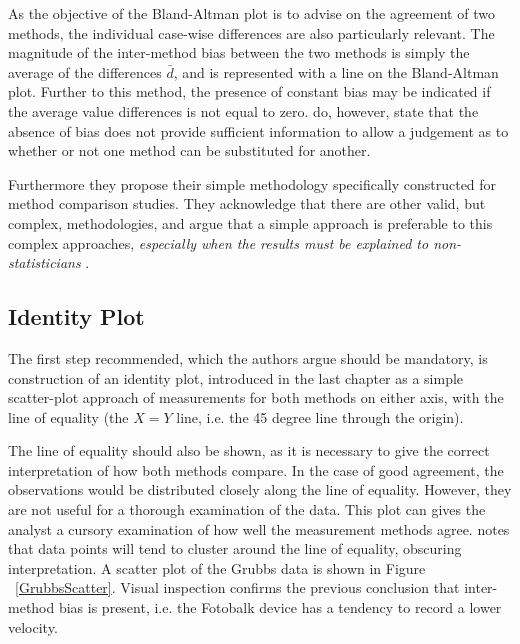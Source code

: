 \documentclass[12pt, a4paper]{report}
\theoremstyle{plain}
\theoremstyle{definition}
\theoremstyle{remark}
\begin{document}
	As the objective of the Bland-Altman plot is to advise on the agreement of two methods, the individual case-wise differences are also particularly relevant.	The magnitude of the inter-method bias between the two methods is simply the average of the differences $\bar{d}$, and is represented with a line on the Bland-Altman plot. Further to this method, the presence of constant bias may be
	indicated if the average value differences is not equal to zero. \citet{BA86} do, however, state that the absence of bias does not provide sufficient information to allow a judgement as to whether or not one method can be substituted for
	another.
	
	Furthermore they propose their simple methodology specifically constructed for method comparison studies. They acknowledge that there are other valid, but complex, methodologies, and argue that
	a simple approach is preferable to this complex approaches,
	\emph{especially when the results must be explained to
		non-statisticians} \citep*{BA83}.
	
	\subsection{Identity Plot}
	The first step recommended, which the authors argue should be mandatory, is construction of an identity plot, introduced in the last chapter as a simple scatter-plot approach of measurements for both methods on either axis, with the line of equality (the $X=Y$ line, i.e. the 45 degree line through the origin). 
	
	The line of equality should also be shown, as it is necessary to give the correct interpretation of how both methods compare. In the case of good agreement, the observations would be distributed closely along the line of equality. However, they are not useful for a thorough examination of the data. This plot can gives the analyst a cursory examination of how well the measurement methods agree. \citet{BritHypSoc} notes that data points will tend to cluster around the line of equality, obscuring interpretation. A scatter plot of the Grubbs data is shown in Figure ~\ref{GrubbsScatter}. Visual inspection confirms the previous conclusion that inter-method bias is present, i.e. the Fotobalk device has a tendency to record a lower velocity.
	
\end{document}
